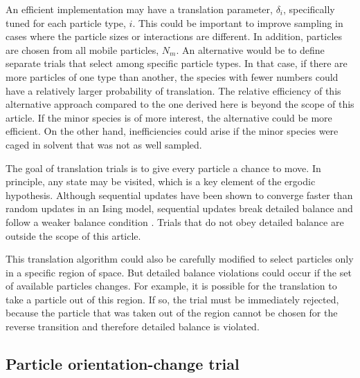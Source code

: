 An efficient implementation may have a translation parameter, $\delta_i$, specifically tuned for each particle type, $i$.
This could be important to improve sampling in cases where the particle sizes or interactions are different.
In addition, particles are chosen from all mobile particles, $N_m$.
An alternative would be to define separate trials that select among specific particle types.
In that case, if there are more particles of one type than another, the species with fewer numbers could have a relatively larger probability of translation.
The relative efficiency of this alternative approach compared to the one derived here is beyond the scope of this article.
If the minor species is of more interest, the alternative could be more efficient.
On the other hand, inefficiencies could arise if the minor species were caged in solvent that was not as well sampled.

The goal of translation trials is to give every particle a chance to move.
In principle, any state may be visited, which is a key element of the ergodic hypothesis.
Although sequential updates have been shown to converge faster than random updates in an Ising model, sequential updates break detailed balance and follow a weaker balance condition \cite{ren_acceleration_2006}.
Trials that do not obey detailed balance are outside the scope of this article.

This translation algorithm could also be carefully modified to select particles only in a specific region of space.
But detailed balance violations could occur if the set of available particles changes.
For example, it is possible for the translation to take a particle out of this region.
If so, the trial must be immediately rejected, because the particle that was taken out of the region cannot be chosen for the reverse transition and therefore detailed balance is violated.

\subsection{\label{sec:lhs_rotation}Particle orientation-change trial}


